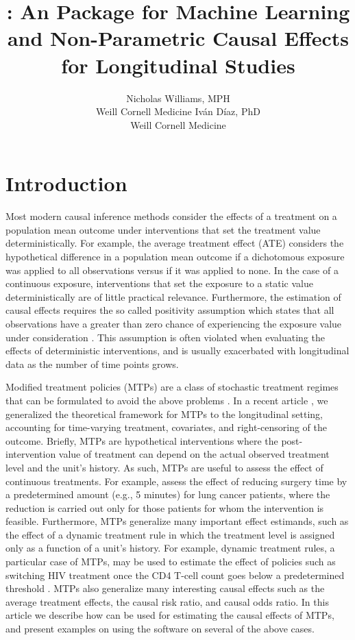 \documentclass[]{jss}
\author{
Nicholas Williams, MPH\\Weill Cornell Medicine \And Iv\'an D\'iaz,
PhD\\Weill Cornell Medicine
}
\title{\pkg{lmtp}: An \proglang{R} Package for Machine Learning and Non-Parametric Causal
Effects for Longitudinal Studies}
\begin{document}
\hypertarget{introduction}{%
\section{Introduction}\label{introduction}}

Most modern causal inference methods consider the effects of a
treatment on a population mean outcome under interventions that set
the treatment value deterministically. For example, the average
treatment effect (ATE) considers the hypothetical difference in a
population mean outcome if a dichotomous exposure was applied to all
observations versus if it was applied to none. In the case of a
continuous exposure, interventions that set the exposure to a static
value deterministically are of little practical
relevance. Furthermore, the estimation of causal effects requires the
so called positivity assumption which states that all observations
have a greater than zero chance of experiencing the exposure value
under consideration
\citep{rosenbaumCentralRolePropensity1983}. This assumption is often
violated when evaluating the effects of deterministic interventions,
and is usually exacerbated with longitudinal data as the number of
time points grows.

 
Modified treatment policies (MTPs) are a class of stochastic treatment
regimes that can be formulated to avoid the above problems
\citep{munozPopulationInterventionCausal2012,
  haneuseEstimationEffectInterventions2013}. In a recent article
\citep{diazNonparametricCausalEffects2020a}, we generalized the
theoretical framework for MTPs to the longitudinal setting, accounting
for time-varying treatment, covariates, and right-censoring of the
outcome. Briefly, MTPs are hypothetical interventions where the
post-intervention value of treatment can depend on the actual observed
treatment level and the unit's history. As such, MTPs are useful to
assess the effect of continuous treatments. For example,
\citet{haneuseEstimationEffectInterventions2013} assess the effect of
reducing surgery time by a predetermined amount (e.g., 5 minutes) for
lung cancer patients, where the reduction is carried out only for
those patients for whom the intervention is feasible. Furthermore,
MTPs generalize many important effect estimands, such as the effect of
a dynamic treatment rule in which the treatment level is assigned only
as a function of a unit's history. For example, dynamic treatment
rules, a particular case of MTPs, may be used to estimate the effect
of policies such as switching HIV treatment once the CD4 T-cell count
goes below a predetermined threshold \citep{petersen2014delayed}. MTPs
also generalize many interesting causal effects such as the average
treatment effects, the causal risk ratio, and causal odds ratio. In
this article we describe how  can be used for estimating the
causal effects of MTPs, and present examples on using the software on
several of the above cases.
\end{document}

